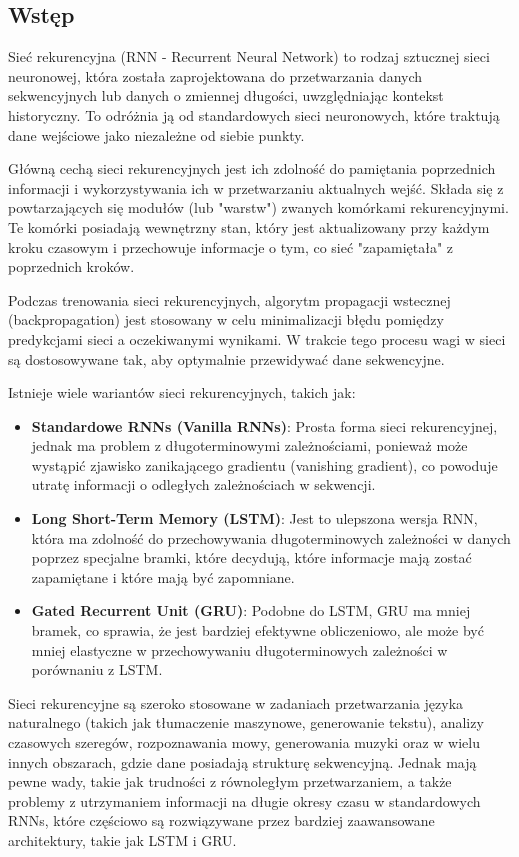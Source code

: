 \documentclass{article}
\begin{document}
\subsection{Wstęp}

Sieć rekurencyjna (RNN - Recurrent Neural Network) to rodzaj sztucznej sieci neuronowej, która została zaprojektowana do przetwarzania danych sekwencyjnych lub danych o zmiennej długości, uwzględniając kontekst historyczny. To odróżnia ją od standardowych sieci neuronowych, które traktują dane wejściowe jako niezależne od siebie punkty.

Główną cechą sieci rekurencyjnych jest ich zdolność do pamiętania poprzednich informacji i wykorzystywania ich w przetwarzaniu aktualnych wejść. Składa się z powtarzających się modułów (lub "warstw") zwanych komórkami rekurencyjnymi. Te komórki posiadają wewnętrzny stan, który jest aktualizowany przy każdym kroku czasowym i przechowuje informacje o tym, co sieć "zapamiętała" z poprzednich kroków.

Podczas trenowania sieci rekurencyjnych, algorytm propagacji wstecznej (backpropagation) jest stosowany w celu minimalizacji błędu pomiędzy predykcjami sieci a oczekiwanymi wynikami. W trakcie tego procesu wagi w sieci są dostosowywane tak, aby optymalnie przewidywać dane sekwencyjne.

Istnieje wiele wariantów sieci rekurencyjnych, takich jak:
\begin{itemize}
    \item \textbf{Standardowe RNNs (Vanilla RNNs)}: Prosta forma sieci rekurencyjnej, jednak ma problem z długoterminowymi zależnościami, ponieważ może wystąpić zjawisko zanikającego gradientu (vanishing gradient), co powoduje utratę informacji o odległych zależnościach w sekwencji.
    \item \textbf{Long Short-Term Memory (LSTM)}: Jest to ulepszona wersja RNN, która ma zdolność do przechowywania długoterminowych zależności w danych poprzez specjalne bramki, które decydują, które informacje mają zostać zapamiętane i które mają być zapomniane.
    \item \textbf{Gated Recurrent Unit (GRU)}: Podobne do LSTM, GRU ma mniej bramek, co sprawia, że jest bardziej efektywne obliczeniowo, ale może być mniej elastyczne w przechowywaniu długoterminowych zależności w porównaniu z LSTM.
\end{itemize}

Sieci rekurencyjne są szeroko stosowane w zadaniach przetwarzania języka naturalnego (takich jak tłumaczenie maszynowe, generowanie tekstu), analizy czasowych szeregów, rozpoznawania mowy, generowania muzyki oraz w wielu innych obszarach, gdzie dane posiadają strukturę sekwencyjną. Jednak mają pewne wady, takie jak trudności z równoległym przetwarzaniem, a także problemy z utrzymaniem informacji na długie okresy czasu w standardowych RNNs, które częściowo są rozwiązywane przez bardziej zaawansowane architektury, takie jak LSTM i GRU.
\end{document}
